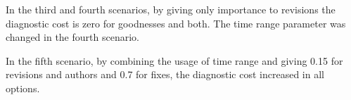 In the third and fourth scenarios, by giving only importance to revisions the
diagnostic cost is zero for goodnesses and both. The time range parameter was
changed in the fourth scenario.

In the fifth scenario, by combining the usage of time range and giving 0.15 for
revisions and authors and 0.7 for fixes, the diagnostic cost increased in all
options.
